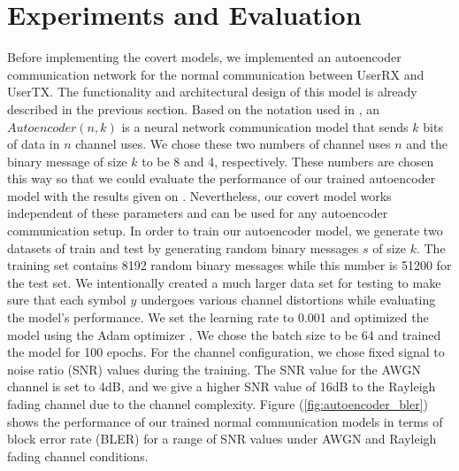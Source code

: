 \section{Experiments and Evaluation}
\label{s:eval}
Before implementing the covert models, we implemented an autoencoder communication network for the normal communication between UserRX and UserTX. The functionality and architectural design of this model is already described in the previous section. Based on the notation used in \cite{o2017introduction}, an \(Autoencoder (n, k)\) is a neural network communication model that sends \(k\) bits of data in \(n\) channel uses. We chose these two numbers of channel uses \(n\) and the binary message of size \(k\) to be 8 and 4, respectively. These numbers are chosen this way so that we could evaluate the performance of our trained autoencoder model with the results given on \cite{o2017introduction}. Nevertheless, our covert model works independent of these parameters and can be used for any autoencoder communication setup. In order to train our autoencoder model, we generate two datasets of train and test by generating random binary messages \(s\) of size \(k\). The training set contains 8192 random binary messages while this number is 51200 for the test set. We intentionally created a much larger data set for testing to make sure that each symbol \(y\) undergoes various channel distortions while evaluating the model's performance. We set the learning rate to 0.001 and optimized the model using the Adam optimizer \cite{kingma2014adam}. We chose the batch size to be 64 and trained the model for 100 epochs. For the channel configuration, we chose fixed signal to noise ratio (SNR) values during the training. The SNR value for the AWGN channel is set to 4dB, and we give a higher SNR value of 16dB to the Rayleigh fading channel due to the channel complexity. Figure (\ref{fig:autoencoder_bler}) shows the performance of our trained normal communication models in terms of block error rate (BLER) for a range of SNR values under AWGN and Rayleigh fading channel conditions.\\

